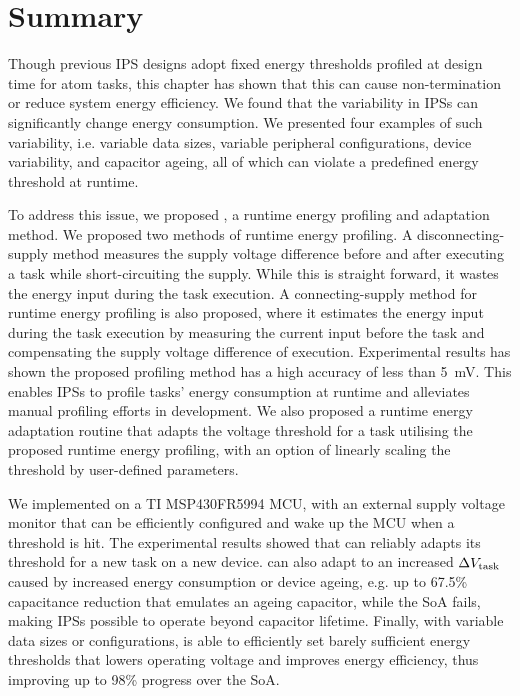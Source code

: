\section{Summary} \label{sec:c5_summary}

Though previous IPS designs adopt fixed energy thresholds profiled at design time for atom tasks, this chapter has shown that this can cause non-termination or reduce system energy efficiency. 
We found that the variability in IPSs can significantly change energy consumption.
We presented four examples of such variability, i.e. variable data sizes, variable peripheral configurations, device variability, and capacitor ageing, all of which can violate a predefined energy threshold at runtime. 

To address this issue, we proposed \nn{}, a runtime energy profiling and adaptation method. 
We proposed two methods of runtime energy profiling. 
A disconnecting-supply method measures the supply voltage difference before and after executing a task while short-circuiting the supply. 
While this is straight forward, it wastes the energy input during the task execution.
A connecting-supply method for runtime energy profiling is also proposed, where it estimates the energy input during the task execution by measuring the current input before the task and compensating the supply voltage difference of execution. 
Experimental results has shown the proposed profiling method has a high accuracy of less than \SI{5}{\milli\volt}.
This enables IPSs to profile tasks' energy consumption at runtime and alleviates manual profiling efforts in development.
We also proposed a runtime energy adaptation routine that adapts the voltage threshold for a task utilising the proposed runtime energy profiling, with an option of linearly scaling the threshold by user-defined parameters. 

We implemented \nn{} on a TI MSP430FR5994 MCU, with an external supply voltage monitor that can be efficiently configured and wake up the MCU when a threshold is hit. 
The experimental results showed that \nn{} can reliably adapts its threshold for a new task on a new device. 
\nn{} can also adapt to an increased $\Delta V_{\text{task}}$ caused by increased energy consumption or device ageing, e.g. up to 67.5\% capacitance reduction that emulates an ageing capacitor, while the SoA fails, making IPSs possible to operate beyond capacitor lifetime. 
Finally, with variable data sizes or configurations, \nn{} is able to efficiently set barely sufficient energy thresholds that lowers operating voltage and improves energy efficiency, thus improving up to 98\% progress over the SoA. 

